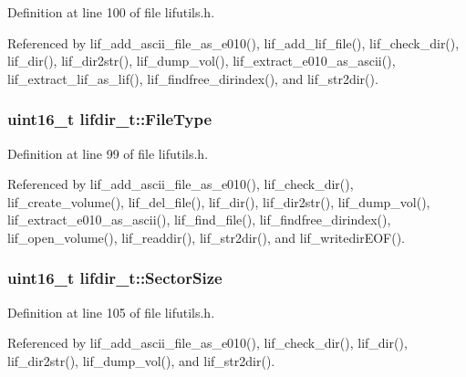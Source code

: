 Definition at line 100 of file lifutils.\+h.



Referenced by lif\+\_\+add\+\_\+ascii\+\_\+file\+\_\+as\+\_\+e010(), lif\+\_\+add\+\_\+lif\+\_\+file(), lif\+\_\+check\+\_\+dir(), lif\+\_\+dir(), lif\+\_\+dir2str(), lif\+\_\+dump\+\_\+vol(), lif\+\_\+extract\+\_\+e010\+\_\+as\+\_\+ascii(), lif\+\_\+extract\+\_\+lif\+\_\+as\+\_\+lif(), lif\+\_\+findfree\+\_\+dirindex(), and lif\+\_\+str2dir().

\subsubsection[{\texorpdfstring{File\+Type}{FileType}}]{\setlength{\rightskip}{0pt plus 5cm}uint16\+\_\+t lifdir\+\_\+t\+::\+File\+Type}\hypertarget{structlifdir__t_a7a93a706ac4bb88f65826619c9b02231}{}\label{structlifdir__t_a7a93a706ac4bb88f65826619c9b02231}


Definition at line 99 of file lifutils.\+h.



Referenced by lif\+\_\+add\+\_\+ascii\+\_\+file\+\_\+as\+\_\+e010(), lif\+\_\+check\+\_\+dir(), lif\+\_\+create\+\_\+volume(), lif\+\_\+del\+\_\+file(), lif\+\_\+dir(), lif\+\_\+dir2str(), lif\+\_\+dump\+\_\+vol(), lif\+\_\+extract\+\_\+e010\+\_\+as\+\_\+ascii(), lif\+\_\+find\+\_\+file(), lif\+\_\+findfree\+\_\+dirindex(), lif\+\_\+open\+\_\+volume(), lif\+\_\+readdir(), lif\+\_\+str2dir(), and lif\+\_\+writedir\+E\+O\+F().

\subsubsection[{\texorpdfstring{Sector\+Size}{SectorSize}}]{\setlength{\rightskip}{0pt plus 5cm}uint16\+\_\+t lifdir\+\_\+t\+::\+Sector\+Size}\hypertarget{structlifdir__t_adf3c38eecddce15925157383ff38ef2d}{}\label{structlifdir__t_adf3c38eecddce15925157383ff38ef2d}


Definition at line 105 of file lifutils.\+h.



Referenced by lif\+\_\+add\+\_\+ascii\+\_\+file\+\_\+as\+\_\+e010(), lif\+\_\+check\+\_\+dir(), lif\+\_\+dir(), lif\+\_\+dir2str(), lif\+\_\+dump\+\_\+vol(), and lif\+\_\+str2dir().

